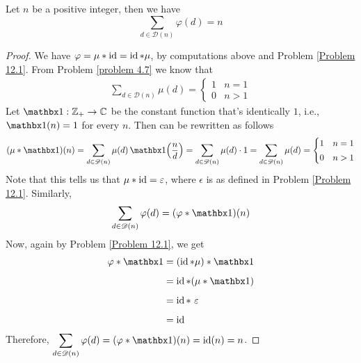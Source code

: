 \begin{lemma}\label{totientsum}
Let $n$ be a positive integer, then we have
\[\sum_{d\in \mathscr{D}(n)}\varphi(d) = n\]
\end{lemma}
\begin{proof}
We have $\varphi = \mu * \operatorname{id} = \operatorname{id} * \mu$, by computations above and Problem \ref{Problem 12.1}. From Problem \ref{problem 4.7} we know that
\begin{align*}\label{mobiussum}
\sum_{d\in \mathscr{D}(n)}\mu(d) = \begin{cases} 1 & n=1\\[0.2em] 0 & n>1\end{cases}\tag{$\bigstar$}
\end{align*}
Let $\one:\zz_+ \to \cc$ be the constant function that's identically $1$, i.e., $\one(n) = 1$ for every $n$. Then  can be rewritten as follows
\[(\mu*\one)(n) = \sum_{d\in \mathscr{D}(n)}\mu(d)\,\one\!\left(\frac{n}{d}\right) = \sum_{d\in \mathscr{D}(n)}\mu(d)\cdot 1 = \sum_{d\in \mathscr{D}(n)}\mu(d) = \begin{cases} 1 & n=1\\[0.2em] 0 & n>1\end{cases}\]
Note that this tells us that $\mu * \operatorname{id} = \varepsilon$, where $\epsilon$ is as defined in Problem \ref{Problem 12.1}. Similarly, 
\[\sum_{d\in \mathscr{D}(n)}\varphi(d) = (\varphi*\one)(n)\]
Now, again by Problem \ref{Problem 12.1}, we get 
\begin{align*}
\varphi*\one &= (\id * \mu) * \one\\[0.5em]
&= \id * (\mu * \one)\\[0.5em]
&= \id *\ \epsilon\\[0.5em]
&= \id
\end{align*}
Therefore, $\displaystyle\sum_{d\in \mathscr{D}(n)}\varphi(d) = (\varphi*\one)(n) = \id(n) = n$.
\end{proof}

